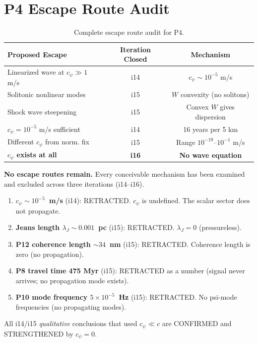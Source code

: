 \documentclass[11pt]{article}
\newcommand{\ee}[1]{\times 10^{#1}}
\begin{document}
\section{P4 Escape Route Audit}

\begin{table}[H]
\centering
\caption{Complete escape route audit for P4.}
\begin{tabular}{@{}lcc@{}}
\toprule
Proposed Escape & Iteration Closed & Mechanism \\
\midrule
Linearized wave at $c_\psi \gg 1$ m/s & i14 & $c_\psi \sim 10^{-5}$ m/s \\
Solitonic nonlinear modes & i15 & $W$ convexity (no solitons) \\
Shock wave steepening & i15 & Convex $W$ gives dispersion \\
$c_\psi = 10^{-5}$ m/s sufficient & i14 & 16 years per 5 km \\
Different $c_\psi$ from norm. fix & i15 & Range $10^{-19}$--$10^{-1}$ m/s \\
\textbf{$c_\psi$ exists at all} & \textbf{i16} & \textbf{No wave equation} \\
\bottomrule
\end{tabular}
\end{table}

\textbf{No escape routes remain.} Every conceivable mechanism has been examined and excluded across three iterations (i14--i16).


\begin{tcolorbox}[colback=blue!5!white, colframe=blue!60!black,
  title=\textbf{W4i16 CORRECTION LOG}]

\begin{enumerate}[nosep]
\item \textbf{$c_\psi \sim 10^{-5}$~m/s} (i14): RETRACTED. $c_\psi$ is undefined.
  The scalar sector does not propagate.
\item \textbf{Jeans length $\lambda_J \sim 0.001$~pc} (i15): RETRACTED.
  $\lambda_J = 0$ (pressureless).
\item \textbf{P12 coherence length $\sim 34$~nm} (i15): RETRACTED.
  Coherence length is zero (no propagation).
\item \textbf{P8 travel time 475 Myr} (i15): RETRACTED as a number
  (signal never arrives; no propagation mode exists).
\item \textbf{P10 mode frequency $5\ee{-5}$~Hz} (i15): RETRACTED.
  No psi-mode frequencies (no propagating modes).
\end{enumerate}

All i14/i15 \emph{qualitative} conclusions that used $c_\psi \ll c$
are CONFIRMED and STRENGTHENED by $c_\psi = 0$.
\end{tcolorbox}
\end{document}
